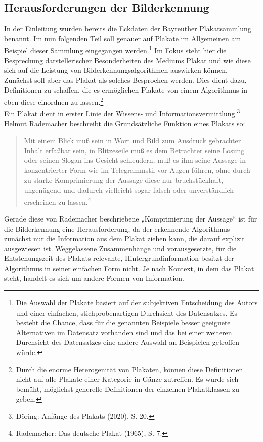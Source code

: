 \documentclass[a4paper,12pt,ngerman]{article}
\begin{document}
\subsection{Herausforderungen der Bilderkennung}
In der Einleitung wurden bereits die Eckdaten der Bayreuther Plakatsammlung benannt. Im nun folgenden Teil soll genauer auf Plakate im Allgemeinen am Beispiel dieser Sammlung eingegangen werden.\footnote{Die Auswahl der Plakate basiert auf der subjektiven Entscheidung des Autors und einer einfachen, stichprobenartigen Durchsicht des Datensatzes. Es besteht die Chance, dass für die genannten Beispiele besser geeignete Alternativen im Datensatz vorhanden sind und das bei einer weiteren Durchsicht des Datensatzes eine andere Auswahl an Beispielen getroffen würde.} Im Fokus steht hier die Besprechung darstellerischer Besonderheiten des Mediums Plakat und wie diese sich auf die Leistung von Bilderkennungsalgorithmen auswirken können. \\
Zunächst soll aber das Plakat als solches Besprochen werden. Dies dient dazu, Definitionen zu schaffen, die es ermöglichen Plakate von einem Algorithmus in eben diese einordnen zu lassen.\footnote{Durch die enorme Heterogenität von Plakaten, können diese Definitionen nicht auf alle Plakate einer Kategorie in Gänze zutreffen. Es wurde sich bemüht, möglichst generelle Definitionen der einzelnen Plakatklassen zu geben.} \\ 
Ein Plakat dient in erster Linie der Wissens- und Informationsvermittlung.\footnote{Döring: Anfänge des Plakats (2020), S. 20.}  Helmut Rademacher beschreibt die Grundsätzliche Funktion eines Plakats so:

\blockquote{\fontsize{10pt}{12pt} \selectfont Mit einem Blick muß sein in Wort und Bild zum Ausdruck gebrachter Inhalt erfaßbar sein, in Blitzeseile muß es dem Betrachter seine Losung oder seinen Slogan ins Gesicht schleudern, muß es ihm seine Aussage in konzentrierter Form wie im Telegrammstil vor Augen führen, ohne durch zu starke Komprimierung der Aussage diese nur bruchstückhaft, ungenügend und dadurch vielleicht sogar falsch oder unverständlich erscheinen zu lassen.\footnote{Rademacher: Das deutsche Plakat (1965), S. 7.}}

Gerade diese von Rademacher beschriebene „Komprimierung der Aussage“ ist für die Bilderkennung eine Herausforderung, da der erkennende Algorithmus zunächst nur die Information aus dem Plakat ziehen kann, die darauf explizit ausgewiesen ist. Weggelassene Zusammenhänge und vorausgesetzte, für die Entstehungszeit des Plakats relevante, Hintergrundinformation besitzt der Algorithmus in seiner einfachen Form nicht.
Je nach Kontext, in dem das Plakat steht, handelt es sich um andere Formen von Information. \\
\end{document}

